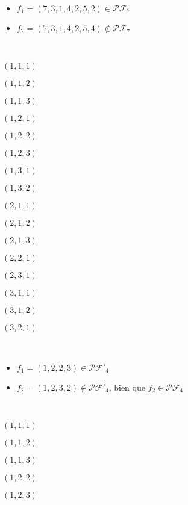 \begin{example}[Définition 1 : $n = 7$]
    ~
    \begin{itemize}
        \item $f_1 = (7, 3, 1, 4, 2, 5, 2) \in \mathcal{PF}_7$
        \item $f_2 = (7, 3, 1, 4, 2, 5, 4) \notin \mathcal{PF}_7$
    \end{itemize}
\end{example}

\begin{example}[Théorème 1 : $n = 3 : pf_3 = 16$]
    ~\\
    \begin{itemize*}             
        \item $(1, 1, 1)$
        \item $(1, 1, 2)$
        \item $(1, 1, 3)$
        \item $(1, 2, 1)$
        \item $(1, 2, 2)$
        \item $(1, 2, 3)$
        \item $(1, 3, 1)$
        \item $(1, 3, 2)$
        \item $(2, 1, 1)$
        \item $(2, 1, 2)$
        \item $(2, 1, 3)$
        \item $(2, 2, 1)$
        \item $(2, 3, 1)$
        \item $(3, 1, 1)$
        \item $(3, 1, 2)$
        \item $(3, 2, 1)$
    \end{itemize*}
\end{example}

\begin{example}[Définition 2 : $n = 4$]
    ~
    \begin{itemize}
        \item $f_1 = (1, 2, 2, 3) \in \mathcal{PF'}_4$
        \item $f_2 = (1, 2, 3, 2) \notin \mathcal{PF'}_4
         \text{, bien que } f_2 \in \mathcal{PF}_4$
    \end{itemize}
\end{example}

\begin{example}[Théorème 2 : $n = 3 : pf'_3 = 5$]
    ~\\
    \begin{itemize*}
        \item $(1, 1, 1)$
        \item $(1, 1, 2)$
        \item $(1, 1, 3)$
        \item $(1, 2, 2)$
        \item $(1, 2, 3)$
    \end{itemize*}
\end{example}

